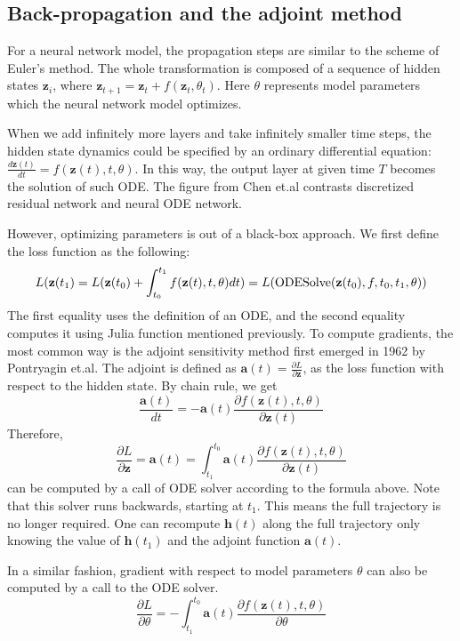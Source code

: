 \documentclass{article}
\begin{document}
\subsection{Back-propagation and the adjoint method}

For a neural network model, the propagation steps are similar to the scheme of Euler's method. The whole transformation is composed of a sequence of hidden states $\mathbf{z}_i$, where $\mathbf{z}_{t+1} = \mathbf{z}_t + f(\mathbf{z}_t, \theta_t)$. Here $\theta$ represents model parameters which the neural network model optimizes.

When we add infinitely more layers and take infinitely smaller time steps, the hidden state dynamics could be specified by an ordinary differential equation: $\frac{d\mathbf{z}(t)}{dt} = f(\mathbf{z}(t), t, \theta)$. In this way, the output layer at given time $T$ becomes the solution of such ODE. The figure from Chen et.al contrasts discretized residual network and neural ODE network.

However, optimizing parameters is out of a black-box approach. We first define the loss function as the following:
$$L(\mathbf{z}({t_1}) = L(\mathbf{z}({t_0}) + \int_{t_0}^{t_1} f(\mathbf{z}(t), t, \theta){dt}) = L(\textup{ODESolve}(\mathbf{z}(t_0), f, {t_0}, {t_1}, \theta))$$
The first equality uses the definition of an ODE, and the second equality computes it using Julia function mentioned previously. To compute gradients, the most common way is the adjoint sensitivity method first emerged in 1962 by Pontryagin et.al. The adjoint is defined as $\mathbf{a}(t) = \frac{\partial{L}}{\partial\mathbf{z}}$, as the loss function with respect to the hidden state. By chain rule, we get $$\frac{\mathbf{a}(t)}{dt} = -\mathbf{a}(t) \frac{\partial{f}(\mathbf{z}(t), t, \theta)}{\partial\mathbf{z}(t)}$$ Therefore, $$\frac{\partial{L}}{\partial\mathbf{z}} = \mathbf{a}(t) =  \int_{t_1}^{t_0}\mathbf{a}(t) \frac{\partial{f}(\mathbf{z}(t), t, \theta)}{\partial\mathbf{z}(t)}$$ can be computed by a call of ODE solver according to the formula above. Note that this solver runs backwards, starting at $t_1$. This means the full trajectory is no longer required. One can recompute $\mathbf{h}(t)$ along the full trajectory only knowing the value of $\mathbf{h}(t_1)$ and the adjoint function $\mathbf{a}(t)$.

In a similar fashion, gradient with respect to model parameters $\theta$ can also be computed by a call to the ODE solver. $$\frac{\partial{L}}{\partial{\theta}} = -\int_{t_1}^{t_0}{\mathbf{a}(t) \frac{\partial{f}(\mathbf{z}(t), t, \theta)}{\partial\theta}}$$
\end{document}

